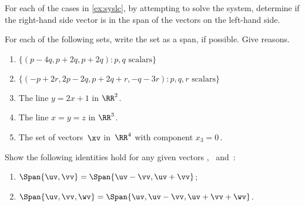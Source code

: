 \begin{exercise} \label{ex:} 
For each of the cases in \autoref{ex:syslc}, by attempting to solve the system, determine if the right-hand side vector is in the span of the vectors on the left-hand side.
\end{exercise}




\begin{exercise} \label{ex:} 
For each of the following sets, write the set as a span, if possible.
Give reasons.
\begin{enumerate}
\item \(\{(p-4q,p+2q,p+2q): p,q\text{ scalars}\}\)

\item \(\{(-p+2r,2p-2q,p+2q+r,-q-3r): p,q,r\text{ scalars}\}\)

\item The line \(y=2x+1\) in \(\RR^2\).

\item The line \(x=y=z\) in \(\RR^3\).

\item The set of vectors~\(\xv\) in~\(\RR^4\) with component \(x_3=0\)\,.
\end{enumerate}
\end{exercise}







\begin{exercise} \label{ex:} 
Show the following identities hold for any given vectors \uv, \vv\ and~\wv:
\begin{enumerate}
\item \(\Span\{\uv,\vv\}=\Span\{\uv-\vv,\uv+\vv\}\);
\item \(\Span\{\uv,\vv,\wv\}=\Span\{\uv,\uv-\vv,\uv+\vv+\wv\}\).
\end{enumerate}
\end{exercise}








